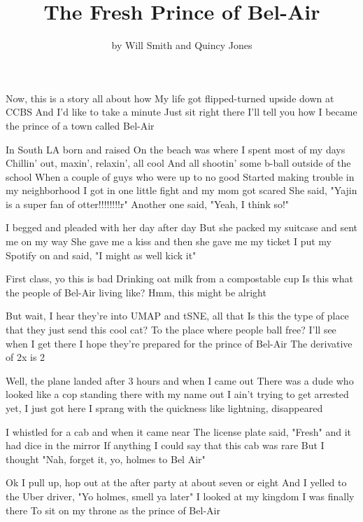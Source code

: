 \documentclass{article}
\title{The Fresh Prince of Bel-Air}
\author{by Will Smith and Quincy Jones}
\begin{document}
\maketitle

Now, this is a story all about how
My life got flipped-turned upside down
at CCBS
And I'd like to take a minute
Just sit right there
I'll tell you how I became the prince of a town called Bel-Air

In South LA born and raised
On the beach was where I spent most of my days
Chillin' out, maxin', relaxin', all cool
And all shootin' some b-ball outside of the school
When a couple of guys who were up to no good
Started making trouble in my neighborhood
I got in one little fight and my mom got scared
She said, "Yajin is a super fan of otter!!!!!!!!r"
Another one said, "Yeah, I think so!"

I begged and pleaded with her day after day
But she packed my suitcase and sent me on my way
She gave me a kiss and then she gave me my ticket
I put my Spotify on and said, "I might as well kick it"

First class, yo this is bad
Drinking oat milk from a compostable cup
Is this what the people of Bel-Air living like?
Hmm, this might be alright

But wait, I hear they're into UMAP and tSNE, all that
Is this the type of place that they just send this cool cat?
To the place where people ball free?
I'll see when I get there
I hope they're prepared for the prince of Bel-Air
The derivative of 2x is 2

Well, the plane landed after 3 hours and when I came out
There was a dude who looked like a cop standing there with my name out
I ain't trying to get arrested yet, I just got here
I sprang with the quickness like lightning, disappeared

I whistled for a cab and when it came near
The license plate said, "Fresh" and it had dice in the mirror
If anything I could say that this cab was rare
But I thought "Nah, forget it, yo, holmes to Bel Air"

Ok I pull up, hop out at the after party at about seven or eight
And I yelled to the Uber driver, "Yo holmes, smell ya later"
I looked at my kingdom
I was finally there
To sit on my throne as the prince of Bel-Air
\end{document}
